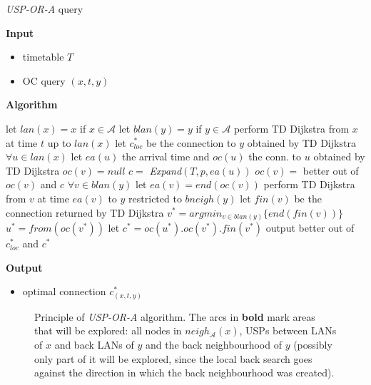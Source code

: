 	\color{algcolor}
	\begin{algorithm}[H]
		\color{inalgcolor}
		\caption{\textit{USP-OR-A} query}
		\label{alg:uspora-query}
		\textbf{Input} 
		\begin{itemize}
			\item timetable $T$
			\item OC query $(x, t, y)$
		\end{itemize}
		\textbf{Algorithm}
		\begin{algorithmic}
			\STATE let $lan(x) = x$ if $x \in \mathcal{A}$
			\STATE let $blan(y) = y$ if $y \in \mathcal{A}$
			\STATE {}
			\STATE perform TD Dijkstra from $x$ at time $t$ up to $lan(x)$
				\STATE let $c_{loc}^{*}$ be the connection to $y$ obtained by TD Dijkstra 
			\ENDIF
			\STATE $\forall u \in lan(x)$ let $ea(u)$ the arrival time and $oc(u)$ the conn. to $u$ obtained by TD Dijkstra
			\STATE {}
				\STATE $oc(v) = null$
						\STATE $c =$ \textit{Expand}$(T, p, ea(u))$
						\STATE $oc(v) =$ better out of $oc(v)$ and $c$
					\ENDFOR
				\ENDFOR
			\ENDFOR
			\STATE $\forall v \in blan(y)$ let $ea(v) = end(oc(v))$
			\STATE {}
				\STATE perform TD Dijkstra from $v$ at time $ea(v)$ to $y$ restricted to $bneigh(y)$
				\STATE let $fin(v)$ be the connection returned by TD Dijkstra
			\ENDFOR
			\STATE $v^{*} = argmin_{v \in blan(y)} \{end(fin(v))\}$
			\STATE $u^{*} = from(oc(v^{*}))$
			\STATE let $c^{*} = oc(u^{*}) . oc(v^{*}) . fin(v^{*})$ 
			\STATE output better out of $c_{loc}^{*}$ and $c^{*}$
		\end{algorithmic}
		\textbf{Output}
		\begin{itemize}
			\item optimal connection $c_{(x, t, y)}^{*}$
		\end{itemize}
	\end{algorithm}
	\color{black}
	
	\begin{figure}[h!]
		\begin{center}
		\end{center}
		\caption{\label{fig:uspora} Principle of \textit{USP-OR-A} algorithm. The arcs in \textbf{bold} mark areas that will be explored: all nodes in $neigh_{\mathcal{A}}(x)$, USPs between LANs of $x$ and back LANs of $y$ and the back neighbourhood of $y$ (possibly only part of it will be explored, since the local back search goes against the direction in which the back neighbourhood was created).}
	\end{figure}
	
